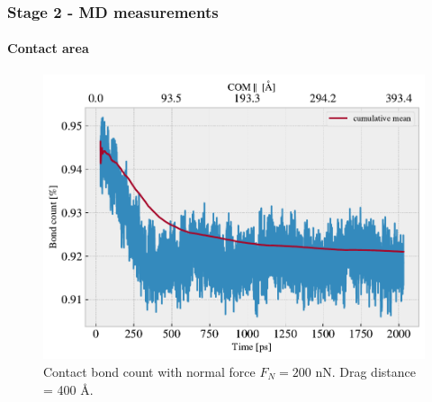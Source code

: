 \documentclass[
	10pt, %
]{beamer}
\begin{document}
\begin{frame}
	\frametitle{Stage 2 - MD measurements}
	\framesubtitle{Contact area}

	
	\begin{figure}
		\includegraphics[width=0.7\linewidth]{figures/contact2.pdf}
		\caption{Contact bond count with normal force $F_N = 200$ nN. Drag distance = 400 Å.}
	\end{figure}	
	
\end{frame}
\end{document}
